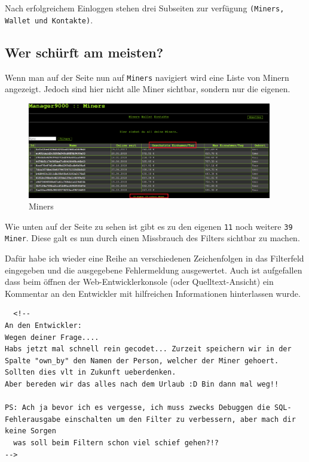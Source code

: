 \documentclass[12pt,a4paper,titlepage,oneside]{scrartcl}
\begin{document}
Nach erfolgreichem Einloggen stehen drei Subseiten zur verfügung \lstinline{(Miners, Wallet und Kontakte)}.

\pagebreak

\subsection{Wer schürft am meisten?}

Wenn man auf der Seite nun auf \lstinline{Miners} navigiert wird eine Liste von Minern angezeigt.
Jedoch sind hier nicht alle Miner sichtbar, sondern nur die eigenen.

\begin{figure}[h!]
  \centering
  \includegraphics[width=0.95\textwidth]{./imgs/manager9000/miners_red.png}
\caption{Miners}
\label{fig:miners}
\end{figure}

Wie unten auf der Seite zu sehen ist gibt es zu den eigenen \lstinline{11} noch weitere \lstinline{39 Miner}.
Diese galt es nun durch einen Missbrauch des Filters sichtbar zu machen.

Dafür habe ich wieder eine Reihe an verschiedenen Zeichenfolgen in das Filterfeld eingegeben und die ausgegebene Fehlermeldung ausgewertet.
Auch ist aufgefallen dass beim öffnen der Web-Entwicklerkonsole (oder Quelltext-Ansicht) ein Kommentar an den Entwickler mit hilfreichen Informationen hinterlassen wurde.

\begin{lstlisting}
  <!--
An den Entwickler:
Wegen deiner Frage....
Habs jetzt mal schnell rein gecodet... Zurzeit speichern wir in der Spalte "own_by" den Namen der Person, welcher der Miner gehoert. Sollten dies vlt in Zukunft ueberdenken.
Aber bereden wir das alles nach dem Urlaub :D Bin dann mal weg!!

PS: Ach ja bevor ich es vergesse, ich muss zwecks Debuggen die SQL-Fehlerausgabe einschalten um den Filter zu verbessern, aber mach dir keine Sorgen
  was soll beim Filtern schon viel schief gehen?!?
-->
\end{lstlisting}
\end{document}
